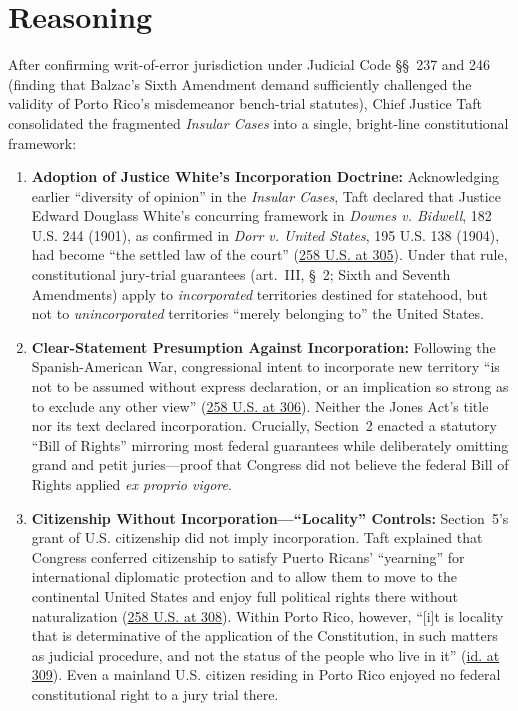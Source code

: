 \documentclass[12pt]{article}
\begin{document}
\section{Reasoning}
After confirming writ-of-error jurisdiction under Judicial Code \S\S~237 and 246 (finding that Balzac's Sixth Amendment demand sufficiently challenged the validity of Porto Rico's misdemeanor bench-trial statutes), Chief Justice Taft consolidated the fragmented \textit{Insular Cases} into a single, bright-line constitutional framework:

\begin{enumerate}
  \item \textbf{Adoption of Justice White's Incorporation Doctrine:} Acknowledging earlier ``diversity of opinion'' in the \textit{Insular Cases}, Taft declared that Justice Edward Douglass White's concurring framework in \textit{Downes v. Bidwell}, 182 U.S. 244 (1901), as confirmed in \textit{Dorr v. United States}, 195 U.S. 138 (1904), had become ``the settled law of the court'' (\href{https://en.wikisource.org/wiki/Balzac_v._Porto_Rico/Opinion_of_the_Court}{258 U.S. at 305}). Under that rule, constitutional jury-trial guarantees (art.~III, \S~2; Sixth and Seventh Amendments) apply to \textit{incorporated} territories destined for statehood, but not to \textit{unincorporated} territories ``merely belonging to'' the United States.
  \item \textbf{Clear-Statement Presumption Against Incorporation:} Following the Spanish-American War, congressional intent to incorporate new territory ``is not to be assumed without express declaration, or an implication so strong as to exclude any other view'' (\href{https://supreme.justia.com/cases/federal/us/258/298/}{258 U.S. at 306}). Neither the Jones Act's title nor its text declared incorporation. Crucially, Section~2 enacted a statutory ``Bill of Rights'' mirroring most federal guarantees while deliberately omitting grand and petit juries---proof that Congress did not believe the federal Bill of Rights applied \textit{ex proprio vigore}.
  \item \textbf{Citizenship Without Incorporation---``Locality'' Controls:} Section~5's grant of U.S. citizenship did not imply incorporation. Taft explained that Congress conferred citizenship to satisfy Puerto Ricans' ``yearning'' for international diplomatic protection and to allow them to move to the continental United States and enjoy full political rights there without naturalization (\href{https://en.wikisource.org/wiki/Balzac_v._Porto_Rico/Opinion_of_the_Court}{258 U.S. at 308}). Within Porto Rico, however, ``[i]t is locality that is determinative of the application of the Constitution, in such matters as judicial procedure, and not the status of the people who live in it'' (\href{https://supreme.justia.com/cases/federal/us/258/298/}{id. at 309}). Even a mainland U.S. citizen residing in Porto Rico enjoyed no federal constitutional right to a jury trial there.

\end{enumerate}
\end{document}
